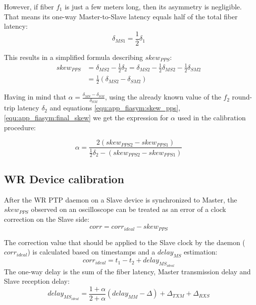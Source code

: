 \noindent However, if fiber $f_1$ is just a few meters long, then its asymmetry is
negligible. That means its one-way Master-to-Slave latency equals half of the
total fiber latency:
\begin{equation}
  \delta_{MS1} = \frac{1}{2} \delta_1
\end{equation}

\noindent This results in a simplified formula describing $skew_{PPS}$:
\begin{align}
  skew_{PPS} &= \delta_{MS2} - \frac{1}{2}\delta_2 = \delta_{MS2} -
  \frac{1}{2}\delta_{MS2} - \frac{1}{2}\delta_{SM2} \nonumber\\
  \label{equ:app_fiasym:final_skew}
  &= \frac{1}{2}(\delta_{MS2} - \delta_{SM2})
\end{align}

\noindent Having in mind that $\alpha = \frac{\delta_{MS} - \delta_{SM}}{\delta_{SM}}$,
using the already known value of the $f_2$ round-trip latency $\delta_2$ and
equations \ref{equ:app_fiasym:skew_pps}, \ref{equ:app_fiasym:final_skew} we get
the expression for $\alpha$ used in the calibration procedure:

\begin{equation}
	\alpha = \frac{2(skew_{PPS2} - skew_{PPS1})}{\frac{1}{2}\delta_2 -
	(skew_{PPS2} - skew_{PPS1})}
\end{equation}

\subsection{WR Device calibration}
\label{subsec:apx:devices}

After the WR PTP daemon on a Slave device is synchronized to Master, the
$skew_{PPS}$ observed on an oscilloscope can be treated as an error of
a clock correction on the Slave side:
\begin{equation}
	\label{equ:devices:corrs}
	corr = corr_{ideal} - skew_{PPS}
\end{equation}

The correction value that should be applied to the Slave clock by the daemon
($corr_{ideal}$) is calculated based on timestamps and a $delay_{MS}$ estimation:
\begin{equation}
	corr_{ideal} = t_1 - t_2 + delay_{MS_{ideal}}
\end{equation}
The one-way delay is the sum of the fiber latency, Master transmission delay and
Slave reception delay:
\begin{equation}
	\label{equ:devices:ideal_delay}
	delay_{MS_{ideal}} = \frac{1+\alpha}{2+\alpha}(delay_{MM} - \Delta) + 
	\Delta_{TXM} + \Delta_{RXS}
\end{equation}

